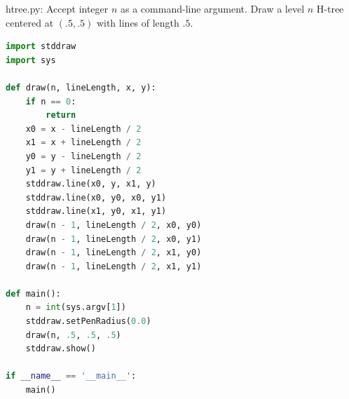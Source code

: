 \documentclass[8pt,a4paper,compress,handout]{beamer}
\begin{document}
\begin{frame}[fragile]
\begin{framed}
\tiny htree.py: Accept integer $n$ as a command-line argument. Draw a level $n$ H-tree centered at $(.5, .5)$ with lines of length $.5$.
\end{framed}

\begin{lstlisting}[language=Python]
import stddraw
import sys

def draw(n, lineLength, x, y):
    if n == 0:
        return
    x0 = x - lineLength / 2
    x1 = x + lineLength / 2
    y0 = y - lineLength / 2
    y1 = y + lineLength / 2
    stddraw.line(x0, y, x1, y)
    stddraw.line(x0, y0, x0, y1)
    stddraw.line(x1, y0, x1, y1)
    draw(n - 1, lineLength / 2, x0, y0)
    draw(n - 1, lineLength / 2, x0, y1)
    draw(n - 1, lineLength / 2, x1, y0)
    draw(n - 1, lineLength / 2, x1, y1)

def main():
    n = int(sys.argv[1])
    stddraw.setPenRadius(0.0)
    draw(n, .5, .5, .5)
    stddraw.show()

if __name__ == '__main__':
    main()
\end{lstlisting}
\end{frame}
\end{document}
